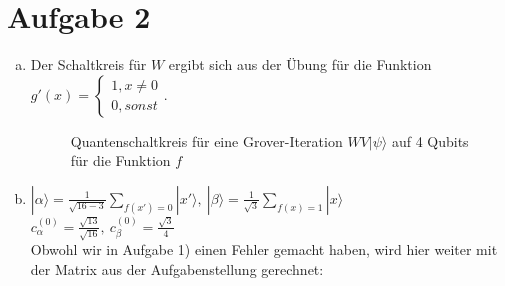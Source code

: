 \documentclass[a4paper]{scrartcl}
\begin{document}
\newpage
\section*{Aufgabe 2}
\begin{enumerate}[a)]
\item
Der Schaltkreis für $W$ ergibt sich aus der Übung für die Funktion $g'(x) = \begin{cases} 1, x\neq 0\\ 0, sonst \end{cases}$.

\begin{figure}[htp] 
\caption{Quantenschaltkreis für eine Grover-Iteration $WV|\psi\rangle$ auf 4 Qubits für die Funktion $f$}
\end{figure}

\item $|\alpha\rangle = \frac{1}{\sqrt{16-3}} \sum_{f(x')=0} |x'\rangle,~ |\beta\rangle = \frac{1}{\sqrt{3}} \sum_{f(x)=1} |x\rangle$\\
$c_{\alpha}^{(0)} = \frac{\sqrt{13}}{\sqrt{16}},~ c_{\beta}^{(0)} = \frac{\sqrt{3}}{4}$\\

Obwohl wir in Aufgabe 1) einen Fehler gemacht haben, wird hier weiter mit der Matrix aus der Aufgabenstellung gerechnet:\\


\end{enumerate}
\end{document}
